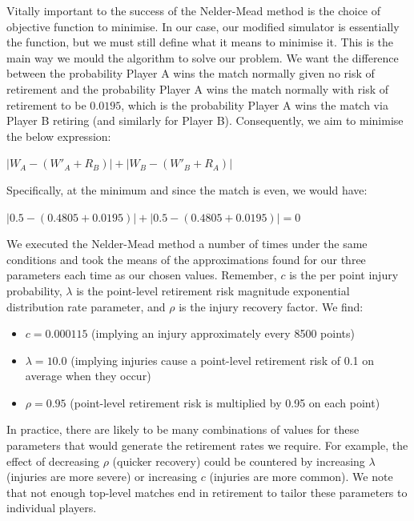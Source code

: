 \documentclass[letterpaper,12pt]{article}
\begin{document}
Vitally important to the success of the Nelder-Mead method is the choice of objective function to minimise.  In our case, our modified simulator is essentially the function, but we must still define what it means to minimise it.  This is the main way we mould the algorithm to solve our problem.  We want the difference between the probability Player A wins the match normally given no risk of retirement and the probability Player A wins the match normally with risk of retirement to be $0.0195$, which is the probability Player A wins the match via Player B retiring (and similarly for Player B).  Consequently, we aim to minimise the below expression:

\begin{center}
	$\left|W_A - (W'_A + R_B)\right| + \left|W_B - (W'_B + R_A)\right|$
\end{center}

Specifically, at the minimum and since the match is even, we would have:

\begin{center}
	$\left|0.5 - (0.4805 + 0.0195)\right| + \left|0.5 - (0.4805 + 0.0195)\right| = 0$
\end{center}

We executed the Nelder-Mead method a number of times under the same conditions and took the means of the approximations found for our three parameters each time as our chosen values.  Remember, $c$ is the per point injury probability, $\lambda$ is the point-level retirement risk magnitude exponential distribution rate parameter, and $\rho$ is the injury recovery factor.  We find:

\begin{itemize}
	\item $c = 0.000115$ (implying an injury approximately every 8500 points)
	\item $\lambda = 10.0$ (implying injuries cause a point-level retirement risk of 0.1 on average when they occur)
	\item $\rho = 0.95$ (point-level retirement risk is multiplied by 0.95 on each point)
\end{itemize}

In practice, there are likely to be many combinations of values for these parameters that would generate the retirement rates we require.  For example, the effect of decreasing $\rho$ (quicker recovery) could be countered by increasing $\lambda$ (injuries are more severe) or increasing $c$ (injuries are more common). We note that not enough top-level matches end in retirement to tailor these parameters to individual players.
\end{document}
